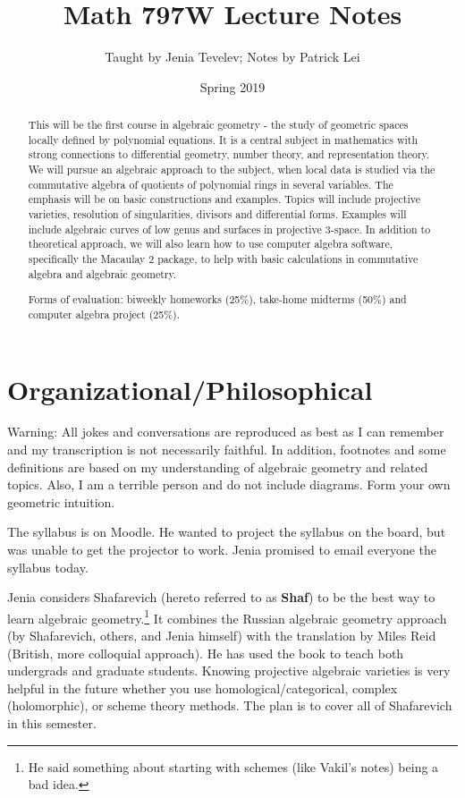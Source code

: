 \documentclass[twoside, 10pt]{article}
\title{Math 797W Lecture Notes}
\author{Taught by Jenia Tevelev; Notes by Patrick Lei}
\affil{University of Massachusetts, Amherst}
\date{Spring 2019}
\begin{document}
    \maketitle\thispagestyle{firstpage}
    
    \begin{abstract}
        This will be the first course in algebraic geometry - the study of geometric spaces locally defined by polynomial equations. It is a central subject in mathematics with strong connections to differential geometry, number theory, and representation theory. We will pursue an algebraic approach to the subject, when local data is studied via the commutative algebra of quotients of polynomial rings in several variables. The emphasis will be on basic constructions and examples. Topics will include projective varieties, resolution of singularities, divisors and differential forms. Examples will include algebraic curves of low genus and surfaces in projective 3-space. In addition to theoretical approach, we will also learn how to use computer algebra software, specifically the Macaulay 2 package, to help with basic calculations in commutative algebra and algebraic geometry.

        Forms of evaluation: biweekly homeworks (25\%), take-home midterms (50\%) and computer algebra project (25\%).
    \end{abstract}

    \tableofcontents

    \section{Organizational/Philosophical}

    Warning: All jokes and conversations are reproduced as best as I can remember and my transcription is not necessarily faithful. In addition, footnotes and some definitions are based on my understanding of algebraic geometry and related topics. Also, I am a terrible person and do not include diagrams. Form your own geometric intuition.

    The syllabus is on Moodle. He wanted to project the syllabus on the board, but was unable to get the projector to work. Jenia promised to email everyone the syllabus today.

    Jenia considers Shafarevich (hereto referred to as \textbf{Shaf}) to be the best way to learn algebraic geometry.\footnote{He said something about starting with schemes (like Vakil's notes) being a bad idea.} It combines the Russian algebraic geometry approach (by Shafarevich, others, and Jenia himself) with the translation by Miles Reid (British, more colloquial approach). He has used the book to teach both undergrads and graduate students. Knowing projective algebraic varieties is very helpful in the future whether you use homological/categorical, complex (holomorphic), or scheme theory methods. The plan is to cover all of Shafarevich in this semester.
    
\end{document}
